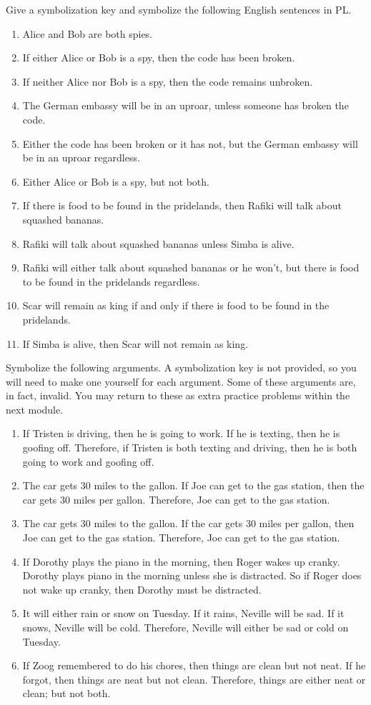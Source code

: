 \problempart
Give a symbolization key and symbolize the following English sentences in PL.
\begin{enumerate}
\item Alice and Bob are both spies.
\item If either Alice or Bob is a spy, then the code has been broken.
\item If neither Alice nor Bob is a spy, then the code remains unbroken.
\item The German embassy will be in an uproar, unless someone has broken the code.
\item Either the code has been broken or it has not, but the German embassy will be in an uproar regardless.
\item Either Alice or Bob is a spy, but not both.
\item If there is food to be found in the pridelands, then Rafiki will talk about squashed bananas.
\item Rafiki will talk about squashed bananas unless Simba is alive.
\item Rafiki will either talk about squashed bananas or he won't, but there is food to be found in the pridelands regardless.
\item Scar will remain as king if and only if there is food to be found in the pridelands.
\item If Simba is alive, then Scar will not remain as king.
\end{enumerate}

\problempart
Symbolize the following arguments. A symbolization key is not provided, so you will need to make one yourself for each argument. Some of these arguments are, in fact, invalid. You may return to these as extra practice problems within the next module.
\begin{enumerate}
\item If Tristen is driving, then he is going to work. If he is texting, then he is goofing off. Therefore, if Tristen is both texting and driving, then he is both going to work and goofing off.
\item The car gets 30 miles to the gallon. If Joe can get to the gas station, then the car gets 30 miles per gallon. Therefore, Joe can get to the gas station.
\item The car gets 30 miles to the gallon. If the car gets 30 miles per gallon, then Joe can get to the gas station. Therefore, Joe can get to the gas station.
\item If Dorothy plays the piano in the morning, then Roger wakes up cranky. Dorothy plays piano in the morning unless she is distracted. So if Roger does not wake up cranky, then Dorothy must be distracted.
\item It will either rain or snow on Tuesday. If it rains, Neville will be sad. If it snows, Neville will be cold. Therefore, Neville will either be sad or cold on Tuesday.
\item If Zoog remembered to do his chores, then things are clean but not neat. If he forgot, then things are neat but not clean. Therefore, things are either neat or clean; but not both.
\end{enumerate}

